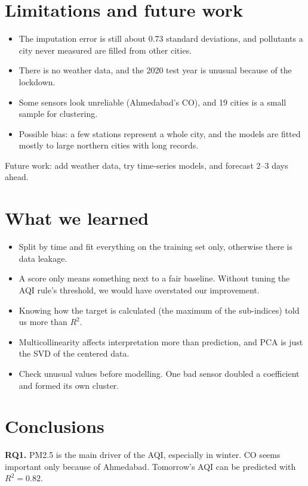 \documentclass[10pt,a4paper]{article}
\begin{document}
\section{Limitations and future work}
\begin{itemize}
\item The imputation error is still about 0.73 standard deviations, and pollutants a city never measured are filled from other cities.
\item There is no weather data, and the 2020 test year is unusual because of the lockdown.
\item Some sensors look unreliable (Ahmedabad's CO), and 19 cities is a small sample for clustering.
\item Possible bias: a few stations represent a whole city, and the models are fitted mostly to large northern cities with long records.
\end{itemize}
Future work: add weather data, try time-series models, and forecast 2--3 days ahead.

\section{What we learned}
\begin{itemize}
\item Split by time and fit everything on the training set only, otherwise there is data leakage.
\item A score only means something next to a fair baseline. Without tuning the AQI rule's threshold, we would have overstated our improvement.
\item Knowing how the target is calculated (the maximum of the sub-indices) told us more than $R^2$.
\item Multicollinearity affects interpretation more than prediction, and PCA is just the SVD of the centered data.
\item Check unusual values before modelling. One bad sensor doubled a coefficient and formed its own cluster.
\end{itemize}

\section{Conclusions}
\textbf{RQ1.} PM2.5 is the main driver of the AQI, especially in winter. CO seems important only because of Ahmedabad. Tomorrow's AQI can be predicted with $R^2=0.82$.
\end{document}
